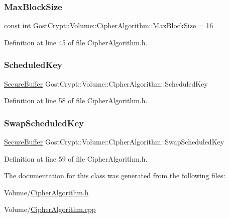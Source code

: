 \subsubsection{\texorpdfstring{Max\+Block\+Size}{MaxBlockSize}}
{\footnotesize\ttfamily const int Gost\+Crypt\+::\+Volume\+::\+Cipher\+Algorithm\+::\+Max\+Block\+Size = 16\hspace{0.3cm}{\ttfamily [static]}}



Definition at line 45 of file Cipher\+Algorithm.\+h.

\mbox{\label{class_gost_crypt_1_1_volume_1_1_cipher_algorithm_a489aa56556ee0b81b588873e3b7df585}} 
\subsubsection{\texorpdfstring{Scheduled\+Key}{ScheduledKey}}
{\footnotesize\ttfamily \hyperlink{class_gost_crypt_1_1_secure_buffer}{Secure\+Buffer} Gost\+Crypt\+::\+Volume\+::\+Cipher\+Algorithm\+::\+Scheduled\+Key\hspace{0.3cm}{\ttfamily [protected]}}



Definition at line 58 of file Cipher\+Algorithm.\+h.

\mbox{\label{class_gost_crypt_1_1_volume_1_1_cipher_algorithm_a7254787df7fb783cc00e39a772751bcb}} 
\subsubsection{\texorpdfstring{Swap\+Scheduled\+Key}{SwapScheduledKey}}
{\footnotesize\ttfamily \hyperlink{class_gost_crypt_1_1_secure_buffer}{Secure\+Buffer} Gost\+Crypt\+::\+Volume\+::\+Cipher\+Algorithm\+::\+Swap\+Scheduled\+Key\hspace{0.3cm}{\ttfamily [protected]}}



Definition at line 59 of file Cipher\+Algorithm.\+h.



The documentation for this class was generated from the following files\+:\begin{DoxyCompactItemize}
\item 
Volume/\hyperlink{_cipher_algorithm_8h}{Cipher\+Algorithm.\+h}\item 
Volume/\hyperlink{_cipher_algorithm_8cpp}{Cipher\+Algorithm.\+cpp}\end{DoxyCompactItemize}
